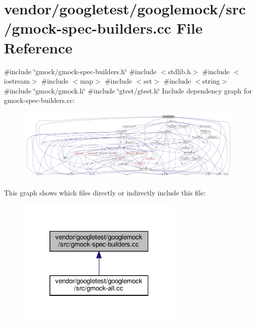 \hypertarget{gmock-spec-builders_8cc}{}\section{vendor/googletest/googlemock/src/gmock-\/spec-\/builders.cc File Reference}
\label{gmock-spec-builders_8cc}
{\ttfamily \#include \char`\"{}gmock/gmock-\/spec-\/builders.\+h\char`\"{}}\newline
{\ttfamily \#include $<$stdlib.\+h$>$}\newline
{\ttfamily \#include $<$iostream$>$}\newline
{\ttfamily \#include $<$map$>$}\newline
{\ttfamily \#include $<$set$>$}\newline
{\ttfamily \#include $<$string$>$}\newline
{\ttfamily \#include \char`\"{}gmock/gmock.\+h\char`\"{}}\newline
{\ttfamily \#include \char`\"{}gtest/gtest.\+h\char`\"{}}\newline
Include dependency graph for gmock-\/spec-\/builders.cc\+:
\nopagebreak
\begin{figure}[H]
\begin{center}
\leavevmode
\includegraphics[width=350pt]{gmock-spec-builders_8cc__incl}
\end{center}
\end{figure}
This graph shows which files directly or indirectly include this file\+:
\nopagebreak
\begin{figure}[H]
\begin{center}
\leavevmode
\includegraphics[width=229pt]{gmock-spec-builders_8cc__dep__incl}
\end{center}
\end{figure}

